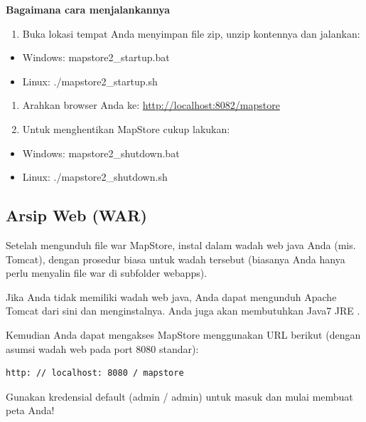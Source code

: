 \documentclass[]{book}
\providecommand{\tightlist}{%
  \setlength{\itemsep}{0pt}\setlength{\parskip}{0pt}}
\begin{document}
\textbf{Bagaimana cara menjalankannya}

\begin{enumerate}
\def\labelenumi{\arabic{enumi}.}
\tightlist
\item
  Buka lokasi tempat Anda menyimpan file zip, unzip kontennya dan jalankan:
\end{enumerate}

\begin{itemize}
\item
  Windows: mapstore2\_startup.bat
\item
  Linux: ./mapstore2\_startup.sh
\end{itemize}

\begin{enumerate}
\def\labelenumi{\arabic{enumi}.}
\setcounter{enumi}{1}
\item
  Arahkan browser Anda ke: \url{http://localhost:8082/mapstore}
\item
  Untuk menghentikan MapStore cukup lakukan:
\end{enumerate}

\begin{itemize}
\item
  Windows: mapstore2\_shutdown.bat
\item
  Linux: ./mapstore2\_shutdown.sh
\end{itemize}

\hypertarget{arsip-web-war}{%
\subsection{Arsip Web (WAR)}\label{arsip-web-war}}

Setelah mengunduh file war MapStore, instal dalam wadah web java Anda (mis. Tomcat), dengan prosedur biasa untuk wadah tersebut (biasanya Anda hanya perlu menyalin file war di subfolder webapps).

Jika Anda tidak memiliki wadah web java, Anda dapat mengunduh Apache Tomcat dari sini dan menginstalnya. Anda juga akan membutuhkan Java7 JRE .

Kemudian Anda dapat mengakses MapStore menggunakan URL berikut (dengan asumsi wadah web pada port 8080 standar):

\begin{verbatim}
http: // localhost: 8080 / mapstore
\end{verbatim}

Gunakan kredensial default (admin / admin) untuk masuk dan mulai membuat peta Anda!
\end{document}
